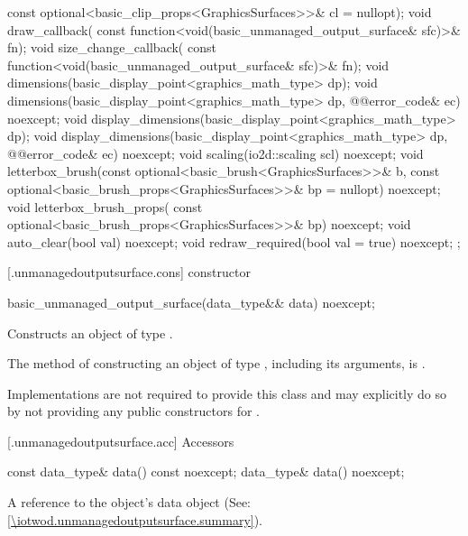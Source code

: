 \begin{codeblock}
{{      const optional<basic_clip_props<GraphicsSurfaces>>& cl = nullopt);
    void draw_callback(
      const function<void(basic_unmanaged_output_surface& sfc)>& fn);
    void size_change_callback(
      const function<void(basic_unmanaged_output_surface& sfc)>& fn);
    void dimensions(basic_display_point<graphics_math_type> dp);
    void dimensions(basic_display_point<graphics_math_type> dp, @\stdqualifier{}@error_code& ec) 
      noexcept;
    void display_dimensions(basic_display_point<graphics_math_type> dp);
    void display_dimensions(basic_display_point<graphics_math_type> dp, 
      @\stdqualifier{}@error_code& ec) noexcept;
    void scaling(io2d::scaling scl) noexcept;
    void letterbox_brush(const optional<basic_brush<GraphicsSurfaces>>& b,
      const optional<basic_brush_props<GraphicsSurfaces>>& bp = nullopt) 
      noexcept;
    void letterbox_brush_props(
      const optional<basic_brush_props<GraphicsSurfaces>>& bp) noexcept;
    void auto_clear(bool val) noexcept;
    void redraw_required(bool val = true) noexcept;
  };
}
\end{codeblock}

 [\iotwod.unmanagedoutputsurface.cons] { constructor}

%
\begin{itemdecl}
basic_unmanaged_output_surface(data_type&& data) noexcept;
\end{itemdecl}
\begin{itemdescr}
\pnum
\effects Constructs an object of type .

\pnum
\remarks The method of constructing an object of type , including its arguments, is .

\pnum
Implementations are not required to provide this class and may explicitly do so by not providing any public constructors for .
\end{itemdescr}

 [\iotwod.unmanagedoutputsurface.acc] {Accessors}

%
\begin{itemdecl}
const data_type& data() const noexcept;
data_type& data() noexcept;
\end{itemdecl}
\begin{itemdescr}
\pnum
\returns A reference to the  object's data object (See: \ref{\iotwod.unmanagedoutputsurface.summary}).
\end{itemdescr}

